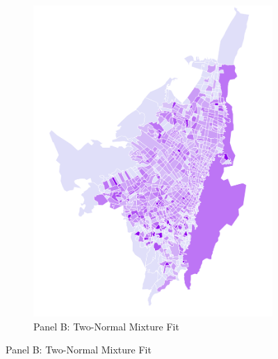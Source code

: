 \documentclass{article}
\begin{document}
\begin{figure}[p]
\begin{subfigure}[b]{0.4\textwidth}
        \includegraphics[width=\linewidth]{figs_dep_maps/mapa_dep_2015.png}
        \caption{Panel B: Two-Normal Mixture Fit}
        \label{fig:panelB}
    \end{subfigure}
    
    \vspace{0.5cm}
    

\end{figure}
\end{document}
